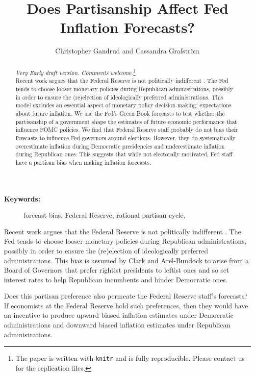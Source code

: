 \documentclass[a4paper]{article}\usepackage{graphicx, color}
\title{Does Partisanship Affect Fed Inflation Forecasts?}
\author{Christopher Gandrud and Cassandra Grafstr\"{o}m}
\begin{document}
\maketitle

\begin{abstract}
\noindent\emph{Very Early draft version. Comments welcome.}\footnote{The paper is written with {\tt{knitr}} \citep{knitr2012} and is fully reproducible. Please contact us for the replication files.} \\[0.2cm]
Recent work argues that the Federal Reserve is not politically indifferent \citep{Clark2011}. The Fed tends to choose looser monetary policies during Republican administrations, possibly in order to ensure the (re)election of ideologically preferred administrations. This model excludes an essential aspect of monetary policy decision-making: expectations about future inflation. We use the Fed's Green Book forecasts to test whether the partisanship of a government shape the estimates of future economic performance that influence FOMC policies. We find that Federal Reserve staff probably do not bias their forecasts to influence Fed governors around elections. However, they do systematically overestimate inflation during Democratic presidencies and underestimate inflation during Republican ones. This suggests that while not electorally motivated, Fed staff have a partisan bias when making inflation forecasts.

\end{abstract}

\begin{description}
  \item [{\textbf{Keywords:}}] forecast bias, Federal Reserve, rational partisan cycle,
\end{description}

\vspace{0.3cm}

Recent work argues that the Federal Reserve is not politically indifferent \citep{Clark2011}. The Fed tends to choose looser monetary policies during Republican administrations, possibly in order to ensure the (re)election of ideologically preferred administrations. This bias is assumed by Clark and Arel-Bundock to arise from a Board of Governors that prefer rightist presidents to leftist ones and so set interest rates to help Republican incumbents and hinder Democratic ones. 

Does this partisan preference also permeate the Federal Reserve staff's forecasts? If economists at the Federal Reserve hold such preferences, then they would have an incentive to produce upward biased inflation estimates under Democratic administrations and downward biased inflation estimates under Republican administrations.
\end{document}
